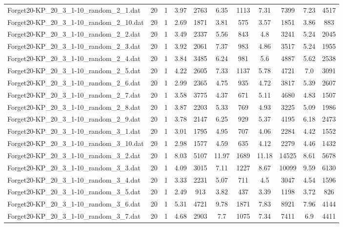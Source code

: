 \begin{table}[!ht]
\begin{tabular}{lcccccccccc}
Forget20-KP\_20\_3\_1-10\_random\_2\_1.dat & 20 & 1 & 3.97 & 2763 & 6.35 & 1113 & 7.31 & 7399 & 7.23 & 4517 \\
Forget20-KP\_20\_3\_1-10\_random\_2\_10.dat & 20 & 1 & 2.69 & 1871 & 3.81 & 575 & 3.57 & 1851 & 3.86 & 883 \\
Forget20-KP\_20\_3\_1-10\_random\_2\_2.dat & 20 & 1 & 3.49 & 2337 & 5.56 & 843 & 4.8 & 3241 & 5.24 & 2045 \\
Forget20-KP\_20\_3\_1-10\_random\_2\_3.dat & 20 & 1 & 3.92 & 2061 & 7.37 & 983 & 4.86 & 3517 & 5.24 & 1955 \\
Forget20-KP\_20\_3\_1-10\_random\_2\_4.dat & 20 & 1 & 3.84 & 3485 & 6.24 & 981 & 5.6 & 4887 & 5.62 & 2538 \\
Forget20-KP\_20\_3\_1-10\_random\_2\_5.dat & 20 & 1 & 4.22 & 2605 & 7.33 & 1137 & 5.78 & 4721 & 7.0 & 3091 \\
Forget20-KP\_20\_3\_1-10\_random\_2\_6.dat & 20 & 1 & 2.99 & 2365 & 4.75 & 935 & 4.72 & 3817 & 5.39 & 2607 \\
Forget20-KP\_20\_3\_1-10\_random\_2\_7.dat & 20 & 1 & 3.58 & 3775 & 4.37 & 671 & 5.11 & 4680 & 4.83 & 1507 \\
Forget20-KP\_20\_3\_1-10\_random\_2\_8.dat & 20 & 1 & 3.87 & 2203 & 5.33 & 769 & 4.93 & 3225 & 5.09 & 1986 \\
Forget20-KP\_20\_3\_1-10\_random\_2\_9.dat & 20 & 1 & 3.78 & 2147 & 6.25 & 929 & 5.37 & 4195 & 6.18 & 2473 \\
Forget20-KP\_20\_3\_1-10\_random\_3\_1.dat & 20 & 1 & 3.01 & 1795 & 4.95 & 707 & 4.06 & 2284 & 4.42 & 1552 \\
Forget20-KP\_20\_3\_1-10\_random\_3\_10.dat & 20 & 1 & 2.98 & 1577 & 4.59 & 635 & 4.12 & 2279 & 4.46 & 1432 \\
Forget20-KP\_20\_3\_1-10\_random\_3\_2.dat & 20 & 1 & 8.03 & 5107 & 11.97 & 1689 & 11.18 & 14525 & 8.61 & 5678 \\
Forget20-KP\_20\_3\_1-10\_random\_3\_3.dat & 20 & 1 & 4.09 & 3015 & 7.11 & 1227 & 8.67 & 10099 & 9.59 & 6130 \\
Forget20-KP\_20\_3\_1-10\_random\_3\_4.dat & 20 & 1 & 3.33 & 2231 & 5.07 & 711 & 4.5 & 3047 & 4.54 & 1596 \\
Forget20-KP\_20\_3\_1-10\_random\_3\_5.dat & 20 & 1 & 2.49 & 913 & 3.82 & 437 & 3.39 & 1198 & 3.72 & 826 \\
Forget20-KP\_20\_3\_1-10\_random\_3\_6.dat & 20 & 1 & 5.31 & 4721 & 9.78 & 1871 & 7.83 & 8921 & 7.96 & 4144 \\
Forget20-KP\_20\_3\_1-10\_random\_3\_7.dat & 20 & 1 & 4.68 & 2903 & 7.7 & 1075 & 7.34 & 7411 & 6.9 & 4411 \\

\end{tabular}
\end{table}

